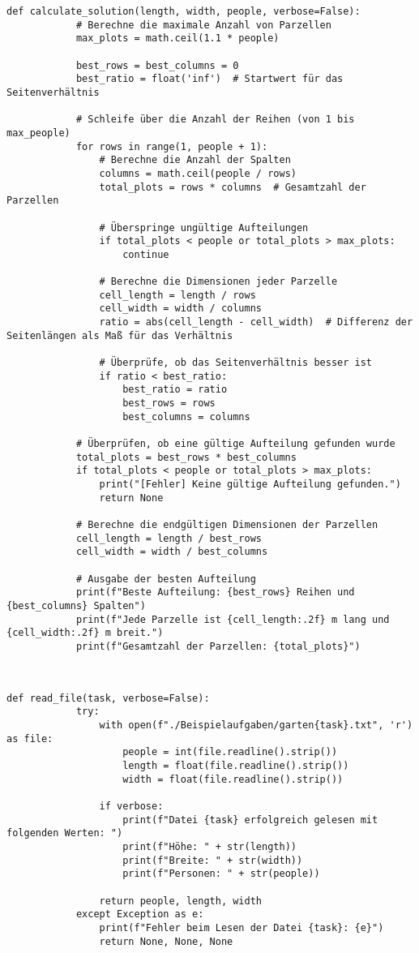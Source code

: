 \documentclass[a4paper,10pt,ngerman]{scrartcl}
\begin{document}
	\begin{lstlisting}[caption=Berechnung der optimalen Aufteilung]
		def calculate_solution(length, width, people, verbose=False):
			# Berechne die maximale Anzahl von Parzellen
			max_plots = math.ceil(1.1 * people)
			
			best_rows = best_columns = 0
			best_ratio = float('inf')  # Startwert für das Seitenverhältnis
			
			# Schleife über die Anzahl der Reihen (von 1 bis max_people)
			for rows in range(1, people + 1):
				# Berechne die Anzahl der Spalten
				columns = math.ceil(people / rows)
				total_plots = rows * columns  # Gesamtzahl der Parzellen
				
				# Überspringe ungültige Aufteilungen
				if total_plots < people or total_plots > max_plots:
					continue
				
				# Berechne die Dimensionen jeder Parzelle
				cell_length = length / rows
				cell_width = width / columns
				ratio = abs(cell_length - cell_width)  # Differenz der Seitenlängen als Maß für das Verhältnis
				
				# Überprüfe, ob das Seitenverhältnis besser ist
				if ratio < best_ratio:
					best_ratio = ratio
					best_rows = rows
					best_columns = columns
			
			# Überprüfen, ob eine gültige Aufteilung gefunden wurde
			total_plots = best_rows * best_columns
			if total_plots < people or total_plots > max_plots:
				print("[Fehler] Keine gültige Aufteilung gefunden.")
				return None
			
			# Berechne die endgültigen Dimensionen der Parzellen
			cell_length = length / best_rows
			cell_width = width / best_columns
			
			# Ausgabe der besten Aufteilung
			print(f"Beste Aufteilung: {best_rows} Reihen und {best_columns} Spalten")
			print(f"Jede Parzelle ist {cell_length:.2f} m lang und {cell_width:.2f} m breit.")
			print(f"Gesamtzahl der Parzellen: {total_plots}")

		
	\end{lstlisting}
	
	\begin{lstlisting}[caption=Datei einlesen]
		def read_file(task, verbose=False):
			try:
				with open(f"./Beispielaufgaben/garten{task}.txt", 'r') as file:
					people = int(file.readline().strip())
					length = float(file.readline().strip())
					width = float(file.readline().strip())
			
				if verbose:
					print(f"Datei {task} erfolgreich gelesen mit folgenden Werten: ")
					print(f"Höhe: " + str(length))
					print(f"Breite: " + str(width))
					print(f"Personen: " + str(people))
			
				return people, length, width
			except Exception as e:
				print(f"Fehler beim Lesen der Datei {task}: {e}")
				return None, None, None

		
	\end{lstlisting}
	
\end{document}

